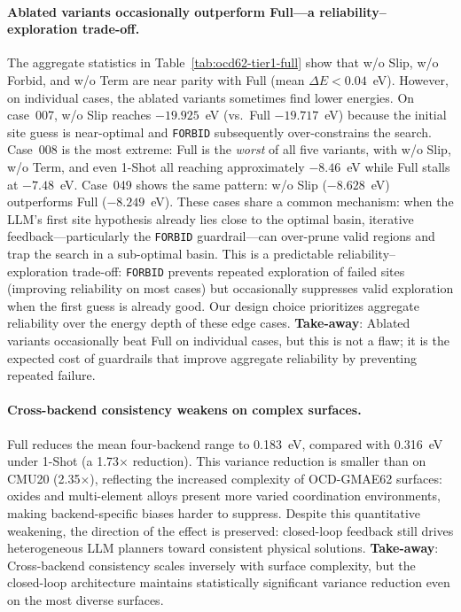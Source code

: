 \paragraph{Ablated variants occasionally outperform Full---a reliability--exploration trade-off.}
The aggregate statistics in Table~\ref{tab:ocd62-tier1-full} show that w/o Slip, w/o Forbid, and w/o Term are near parity with Full (mean $\Delta E < 0.04$~eV).
However, on individual cases, the ablated variants sometimes find lower energies.
On case~007, w/o Slip reaches $-19.925$~eV (vs.\ Full $-19.717$~eV) because the initial site guess is near-optimal and \texttt{FORBID} subsequently over-constrains the search.
Case~008 is the most extreme: Full is the \emph{worst} of all five variants, with w/o Slip, w/o Term, and even 1-Shot all reaching approximately $-8.46$~eV while Full stalls at $-7.48$~eV.
Case~049 shows the same pattern: w/o Slip ($-8.628$~eV) outperforms Full ($-8.249$~eV).
These cases share a common mechanism: when the LLM's first site hypothesis already lies close to the optimal basin, iterative feedback---particularly the \texttt{FORBID} guardrail---can over-prune valid regions and trap the search in a sub-optimal basin.
This is a predictable reliability--exploration trade-off: \texttt{FORBID} prevents repeated exploration of failed sites (improving reliability on most cases) but occasionally suppresses valid exploration when the first guess is already good.
Our design choice prioritizes aggregate reliability over the energy depth of these edge cases.
\textbf{Take-away}: Ablated variants occasionally beat Full on individual cases, but this is not a flaw; it is the expected cost of guardrails that improve aggregate reliability by preventing repeated failure.

\paragraph{Cross-backend consistency weakens on complex surfaces.}
Full reduces the mean four-backend range to 0.183~eV, compared with 0.316~eV under 1-Shot (a 1.73$\times$ reduction).
This variance reduction is smaller than on CMU20 (2.35$\times$), reflecting the increased complexity of OCD-GMAE62 surfaces: oxides and multi-element alloys present more varied coordination environments, making backend-specific biases harder to suppress.
Despite this quantitative weakening, the direction of the effect is preserved: closed-loop feedback still drives heterogeneous LLM planners toward consistent physical solutions.
\textbf{Take-away}: Cross-backend consistency scales inversely with surface complexity, but the closed-loop architecture maintains statistically significant variance reduction even on the most diverse surfaces.

